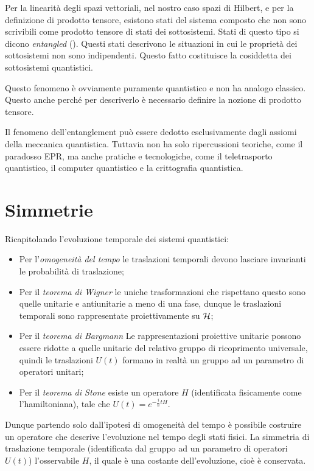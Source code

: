 \documentclass[../../FisicaTeorica.tex]{subfiles}
\begin{document}
\begin{oss}
Per la linearità degli spazi vettoriali, nel nostro caso spazi di Hilbert, e per la definizione di prodotto tensore, esistono stati del sistema composto che non sono scrivibili come prodotto tensore di stati dei sottosistemi. Stati di questo tipo si dicono \emph{entangled} (). Questi stati descrivono le situazioni in cui le proprietà dei sottosistemi non sono indipendenti. Questo fatto costituisce la cosiddetta  dei sottosistemi quantistici.

Questo fenomeno è ovviamente puramente quantistico e non ha analogo classico. Questo anche perché per descriverlo è necessario definire la nozione di prodotto tensore.

Il fenomeno dell'entanglement può essere dedotto esclusivamente dagli assiomi della meccanica quantistica. Tuttavia non ha solo ripercussioni teoriche, come il paradosso EPR, ma anche pratiche e tecnologiche, come il teletrasporto quantistico, il computer quantistico e la crittografia quantistica.
\end{oss}



\section{Simmetrie}
Ricapitolando l'evoluzione temporale dei sistemi quantistici:
\begin{itemize}
\item Per l'\emph{omogeneità del tempo} le traslazioni temporali devono lasciare invarianti le probabilità di traslazione;
\item Per il \emph{teorema di Wigner} le uniche trasformazioni che rispettano questo sono quelle unitarie e antiunitarie a meno di una fase, dunque le traslazioni temporali sono rappresentate proiettivamente su $\mathcal{H}$;
\item Per il \emph{teorema di Bargmann} Le rappresentazioni proiettive unitarie possono essere ridotte a quelle unitarie del relativo gruppo di ricoprimento universale, quindi le traslazioni $U(t)$ formano in realtà un gruppo ad un parametro di operatori unitari;
\item Per il \emph{teorema di Stone} esiste un operatore $H$ (identificata fisicamente come l'hamiltoniana), tale che $U(t) = e^{-\frac{i}{\hbar} t H}$.
\end{itemize}

Dunque partendo solo dall'ipotesi di omogeneità del tempo è possibile costruire un operatore che descrive l'evoluzione nel tempo degli stati fisici. La simmetria di traslazione temporale (identificata dal gruppo ad un parametro di operatori $U(t)$)  l'osservabile $H$, il quale è una costante dell'evoluzione, cioè è conservata.
\end{document}
